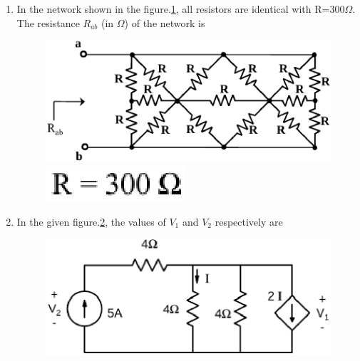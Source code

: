 \documentclass[journal,12pt,twocolumn]{IEEEtran}
\begin{document}
\begin{enumerate}
\item In the network shown in the figure.\ref{fig100}, all resistors are identical with R=300$ \Omega $. The resistance $ R_{ab} $ (in $ \Omega $) of the network is
\begin{figure}[!h]
\begin{center}
\includegraphics[scale=0.5]{./figs/fig100.eps}
\includegraphics[scale=0.7]{./figs/fig100a.eps}
\caption{}
\label{fig100}
\end{center}
\end{figure}

\item In the given figure.\ref{fig101}, the values of $ V_{1} $ and $ V_{2} $ respectively are
\begin{enumerate}
\setlength\itemsep{2em}
\begin{figure}[!h]
\begin{center}
\includegraphics[scale=0.7]{./figs/fig101.eps}
\caption{}
\label{fig101}
\end{center}
\end{figure}
\end{enumerate}



\end{enumerate}
\end{document}
